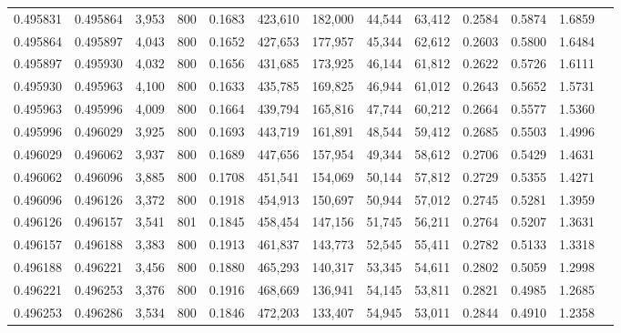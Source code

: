 \begin{tabular}{rrrrrrrrrrrrr}
0.495831 & 0.495864 &  3,953 & 800 &                                     0.1683 & 423,610 & 182,000 &  44,544 &  63,412 & 0.2584 & 0.5874 & 1.6859 \\
0.495864 & 0.495897 &  4,043 & 800 &                                     0.1652 & 427,653 & 177,957 &  45,344 &  62,612 & 0.2603 & 0.5800 & 1.6484 \\
0.495897 & 0.495930 &  4,032 & 800 &                                     0.1656 & 431,685 & 173,925 &  46,144 &  61,812 & 0.2622 & 0.5726 & 1.6111 \\
0.495930 & 0.495963 &  4,100 & 800 &                                     0.1633 & 435,785 & 169,825 &  46,944 &  61,012 & 0.2643 & 0.5652 & 1.5731 \\
0.495963 & 0.495996 &  4,009 & 800 &                                     0.1664 & 439,794 & 165,816 &  47,744 &  60,212 & 0.2664 & 0.5577 & 1.5360 \\
0.495996 & 0.496029 &  3,925 & 800 &                                     0.1693 & 443,719 & 161,891 &  48,544 &  59,412 & 0.2685 & 0.5503 & 1.4996 \\
0.496029 & 0.496062 &  3,937 & 800 &                                     0.1689 & 447,656 & 157,954 &  49,344 &  58,612 & 0.2706 & 0.5429 & 1.4631 \\
0.496062 & 0.496096 &  3,885 & 800 &                                     0.1708 & 451,541 & 154,069 &  50,144 &  57,812 & 0.2729 & 0.5355 & 1.4271 \\
0.496096 & 0.496126 &  3,372 & 800 &                                     0.1918 & 454,913 & 150,697 &  50,944 &  57,012 & 0.2745 & 0.5281 & 1.3959 \\
0.496126 & 0.496157 &  3,541 & 801 &                                     0.1845 & 458,454 & 147,156 &  51,745 &  56,211 & 0.2764 & 0.5207 & 1.3631 \\
0.496157 & 0.496188 &  3,383 & 800 &                                     0.1913 & 461,837 & 143,773 &  52,545 &  55,411 & 0.2782 & 0.5133 & 1.3318 \\
0.496188 & 0.496221 &  3,456 & 800 &                                     0.1880 & 465,293 & 140,317 &  53,345 &  54,611 & 0.2802 & 0.5059 & 1.2998 \\
0.496221 & 0.496253 &  3,376 & 800 &                                     0.1916 & 468,669 & 136,941 &  54,145 &  53,811 & 0.2821 & 0.4985 & 1.2685 \\
0.496253 & 0.496286 &  3,534 & 800 &                                     0.1846 & 472,203 & 133,407 &  54,945 &  53,011 & 0.2844 & 0.4910 & 1.2358 \\

\end{tabular}
